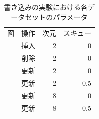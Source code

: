 \begin{table}[tb]
  \caption{書き込みの実験における各データセットのパラメータ}
  \label{tab:rec}
  \centering \small
  \begin{tabular}{llrr}
    \toprule
    図                              & 操作 & 次元 & スキュー \\
    \cmidrule(lr){1-1}
    \cmidrule(lr){2-2}
    \cmidrule(lr){3-3}
    \cmidrule(lr){4-4}
    \Fig{\ref{graph:rec-ins}}       & 挿入 & 2    & 0        \\
    \Fig{\ref{graph:rec-del}}       & 削除 & 2    & 0        \\
    \Fig{\ref{graph:rec-upd-2-0}}   & 更新 & 2    & 0        \\
    \Fig{\ref{graph:rec-upd-2-0.5}} & 更新 & 2    & 0.5      \\
    \Fig{\ref{graph:rec-upd-8-0}}   & 更新 & 8    & 0        \\
    \Fig{\ref{graph:rec-upd-8-0.5}} & 更新 & 8    & 0.5      \\
    \bottomrule
  \end{tabular}
\end{table}
